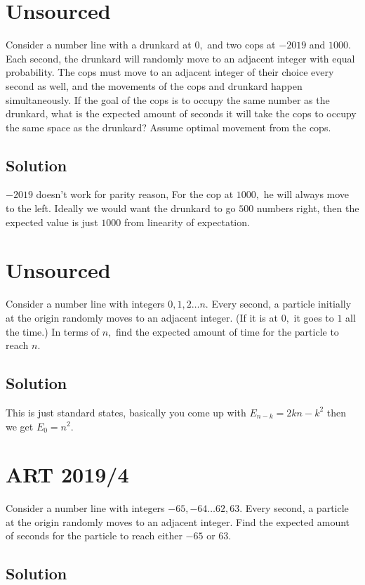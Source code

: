 \documentclass[blue,onecol]{shooting}
\begin{document}
\section{Unsourced}
Consider a number line with a drunkard at $0,$ and two cops at $-2019$ and $1000.$ Each second, the drunkard will randomly move to an adjacent integer with equal probability. The cops must move to an adjacent integer of their choice every second as well, and the movements of the cops and drunkard happen simultaneously. If the goal of the cops is to occupy the same number as the drunkard, what is the expected amount of seconds it will take the cops to occupy the same space as the drunkard? Assume optimal movement from the cops.
\subsection{Solution}
$-2019$ doesn't work for parity reason, For the cop at $1000,$ he will always move to the left. Ideally we would want the drunkard to go $500$ numbers right, then the expected value is just $1000$ from linearity of expectation.      


\section{Unsourced}
Consider a number line with integers $0,1,2\dots n.$ Every second, a particle initially at the origin randomly moves to an adjacent integer. (If it is at $0,$ it goes to $1$ all the time.) In terms of $n,$ find the expected amount of time for the particle to reach $n.$
\subsection{Solution}
This is just standard states, basically you come up with $E_{n-k}=2kn-k^2$ then we get $E_0 = n^2.$



\section{ART 2019/4} Consider a number line with integers $-65,-64\dots 62,63.$ Every second, a particle at the origin randomly moves to an adjacent integer. Find the expected amount of seconds for the particle to reach either $-65$ or $63.$
\subsection{Solution}    
\end{document}
